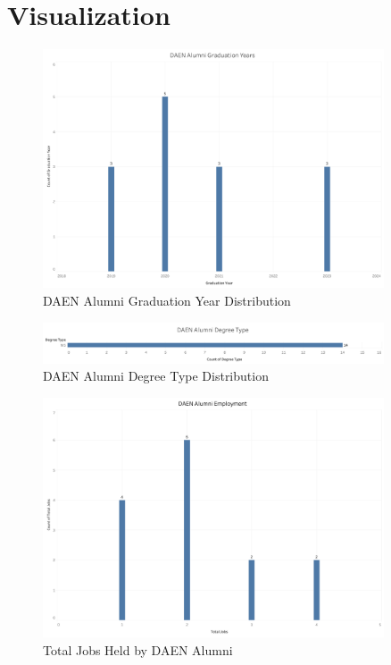 \documentclass[12pt,a4paper]{article}
\begin{document}
\section{Visualization}
\begin{figure}[H]
    \centering
    \includegraphics[width=0.9\textwidth]{visualizations/graduation-year.png}
    \caption{DAEN Alumni Graduation Year Distribution}
    \label{fig:graudation-year}
\end{figure}
\begin{figure}[H]
    \centering
    \includegraphics[width=0.9\textwidth]{visualizations/degree-type.png}
    \caption{DAEN Alumni Degree Type Distribution}
    \label{fig:degree-type}
\end{figure}

\begin{figure}[H]
    \centering
    \includegraphics[width=0.9\textwidth]{visualizations/total-jobs.png}
    \caption{Total Jobs Held by DAEN Alumni}
    \label{fig:total-jobs}
\end{figure}
\end{document}
